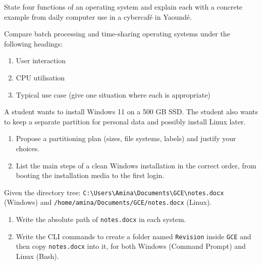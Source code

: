 \documentclass[11pt]{article}
\newcounter{popsec}
\newcounter{popsub}
\newcommand{\courssub}[1]{%
  \stepcounter{popsub}%
  \par\vspace{9pt}\noindent{\popxbold\fontsize{11.5}{13}\selectfont\color{popink}{\color{poporange}\thepopsec.\thepopsub}\hspace{6pt}#1}\par\nopagebreak\vspace{4pt}
}
\begin{document}
\begin{exercice}
State four functions of an operating system and explain each with a concrete example from daily computer use in a cybercafé in Yaoundé.
\end{exercice}

\begin{exercice}
Compare batch processing and time-sharing operating systems under the following headings:
\begin{enumerate}
\item User interaction
\item CPU utilisation
\item Typical use case (give one situation where each is appropriate)
\end{enumerate}
\end{exercice}

\begin{exercice}
A student wants to install Windows 11 on a 500 GB SSD. The student also wants to keep a separate partition for personal data and possibly install Linux later.
\begin{enumerate}
\item Propose a partitioning plan (sizes, file systems, labels) and justify your choices.
\item List the main steps of a clean Windows installation in the correct order, from booting the installation media to the first login.
\end{enumerate}
\end{exercice}

\begin{exercice}
Given the directory tree: \texttt{C:\textbackslash Users\textbackslash Amina\textbackslash Documents\textbackslash GCE\textbackslash notes.docx} (Windows) and \texttt{/home/amina/Documents/GCE/notes.docx} (Linux).
\begin{enumerate}
\item Write the absolute path of \texttt{notes.docx} in each system.
\item Write the CLI commands to create a folder named \texttt{Revision} inside \texttt{GCE} and then copy \texttt{notes.docx} into it, for both Windows (Command Prompt) and Linux (Bash).
\end{enumerate}
\end{exercice}

\courssub{I prepare for the GCE}
\end{document}
